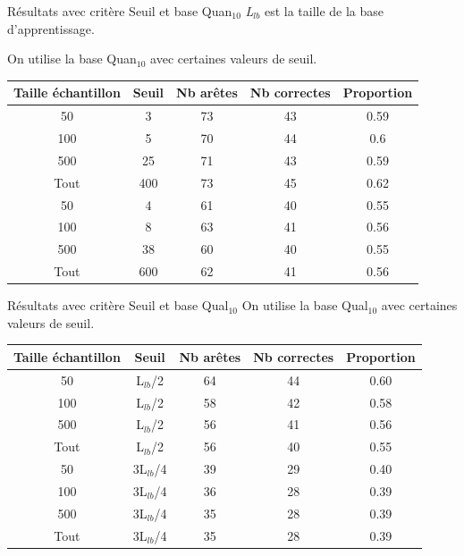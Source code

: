 \documentclass{beamer}
\begin{document}
\begin{frame}{Résultats avec critère Seuil et base Quan$_{10}$}
\emph{L$_{lb}$} est la taille de la base d'apprentissage. 


On utilise la base Quan$_{10}$ avec certaines valeurs de seuil.

\begin{tabular}{|c|c|c|c|c|}
   \hline
   Taille échantillon & Seuil & Nb arêtes & Nb correctes & Proportion\\
   \hline
   50 & 3 & 73 & 43 & 0.59  \\   
   \hline
   100 & 5 & 70 & 44 & 0.6  \\
   \hline
   500 & 25 & 71 & 43 & 0.59  \\
   \hline
   Tout & 400 & 73 & 45 & 0.62 \\
   \hline
   50 & 4 & 61 & 40 & 0.55  \\
   \hline
   100 & 8 & 63 & 41 & 0.56  \\
   \hline
   500 & 38 & 60 & 40 & 0.55  \\
   \hline
   Tout & 600 & 62 & 41 & 0.56 \\
\end{tabular}


\end{frame}

\begin{frame}{Résultats avec critère Seuil et base Qual$_{10}$}
On utilise la base Qual$_{10}$ avec certaines valeurs de seuil.
\begin{tabular}{|c|c|c|c|c|}
   \hline
   Taille échantillon & Seuil & Nb arêtes & Nb correctes & Proportion\\
    \hline
   50 & L$_{lb}$/2 & 64 & 44 & 0.60  \\
   \hline
   100 & L$_{lb}$/2 & 58 & 42 & 0.58  \\
   \hline
   500 & L$_{lb}$/2 & 56 & 41 & 0.56  \\
   \hline
   Tout & L$_{lb}$/2 & 56 & 40 & 0.55 \\
   \hline
   50 & 3L$_{lb}$/4 & 39 & 29 & 0.40  \\
   \hline
   100 & 3L$_{lb}$/4 & 36 & 28 & 0.39  \\
   \hline
   500 & 3L$_{lb}$/4 & 35 & 28 & 0.39  \\
   \hline
   Tout & 3L$_{lb}$/4 & 35 & 28 & 0.39 \\
\end{tabular}
\end{frame}
\end{document}
